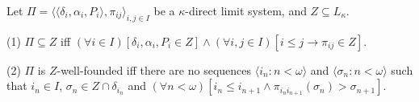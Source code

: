 Let $\Pi = \langle \langle \delta_i, \alpha_i, P_i \rangle, \pi_{ij} \rangle_{i,j \in I}$ be a $\kappa$-direct limit system, and $Z \subseteq L_\kappa$.

(1) $\Pi \subseteq Z$ iff $(\forall i \in I)[\delta_i, \alpha_i, P_i \in Z] \wedge (\forall i, j \in I)[i \leq j \rightarrow \pi_{ij} \in Z]$.

(2) $\Pi$ is $Z$-well-founded iff there are no sequences $\langle i_n : n < \omega \rangle$ and $\langle \sigma_n : n < \omega \rangle$ such that $i_n \in I$, $\sigma_n \in Z \cap \delta_{i_n}$ and $(\forall n < \omega)[i_n \leq i_{n+1} \wedge \pi_{i_n i_{n+1}}(\sigma_n) > \sigma_{n+1}]$.
